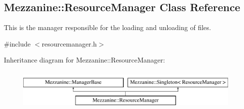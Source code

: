 \hypertarget{classMezzanine_1_1ResourceManager}{
\subsection{Mezzanine::ResourceManager Class Reference}
\label{classMezzanine_1_1ResourceManager}
}


This is the manager responsible for the loading and unloading of files.  




{\ttfamily \#include $<$resourcemanager.h$>$}

Inheritance diagram for Mezzanine::ResourceManager:\begin{figure}[H]
\begin{center}
\leavevmode
\includegraphics[height=2.000000cm]{classMezzanine_1_1ResourceManager}
\end{center}
\end{figure}
